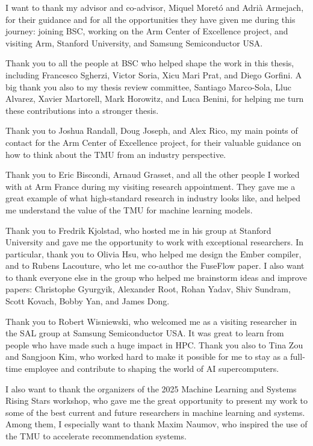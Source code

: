\begin{acknowledgements}
I want to thank my advisor and co-advisor, Miquel Moretó and Adrià Armejach, for their guidance and for all the opportunities they have given me during this journey: joining BSC, working on the Arm Center of Excellence project, and visiting Arm, Stanford University, and Samsung Semiconductor USA.

Thank you to all the people at BSC who helped shape the work in this thesis, including Francesco Sgherzi, Victor Soria, Xicu Mari Prat, and Diego Gorfini. A big thank you also to my thesis review committee, Santiago Marco-Sola, Lluc Alvarez, Xavier Martorell, Mark Horowitz, and Luca Benini, for helping me turn these contributions into a stronger thesis.

Thank you to Joshua Randall, Doug Joseph, and Alex Rico, my main points of contact for the Arm Center of Excellence project, for their valuable guidance on how to think about the TMU from an industry perspective.

Thank you to Eric Biscondi, Arnaud Grasset, and all the other people I worked with at Arm France during my visiting research appointment. They gave me a great example of what high-standard research in industry looks like, and helped me understand the value of the TMU for machine learning models.

Thank you to Fredrik Kjolstad, who hosted me in his group at Stanford University and gave me the opportunity to work with exceptional researchers. In particular, thank you to Olivia Hsu, who helped me design the Ember compiler, and to Rubens Lacouture, who let me co-author the FuseFlow paper. I also want to thank everyone else in the group who helped me brainstorm ideas and improve papers: Christophe Gyurgyik, Alexander Root, Rohan Yadav, Shiv Sundram, Scott Kovach, Bobby Yan, and James Dong.

Thank you to Robert Wisniewski, who welcomed me as a visiting researcher in the SAL group at Samsung Semiconductor USA. It was great to learn from people who have made such a huge impact in HPC. Thank you also to Tina Zou and Sangjoon Kim, who worked hard to make it possible for me to stay as a full-time employee and contribute to shaping the world of AI supercomputers.

I also want to thank the organizers of the 2025 Machine Learning and Systems Rising Stars workshop, who gave me the great opportunity to present my work to some of the best current and future researchers in machine learning and systems. Among them, I especially want to thank Maxim Naumov, who inspired the use of the TMU to accelerate recommendation systems.


\end{acknowledgements}

